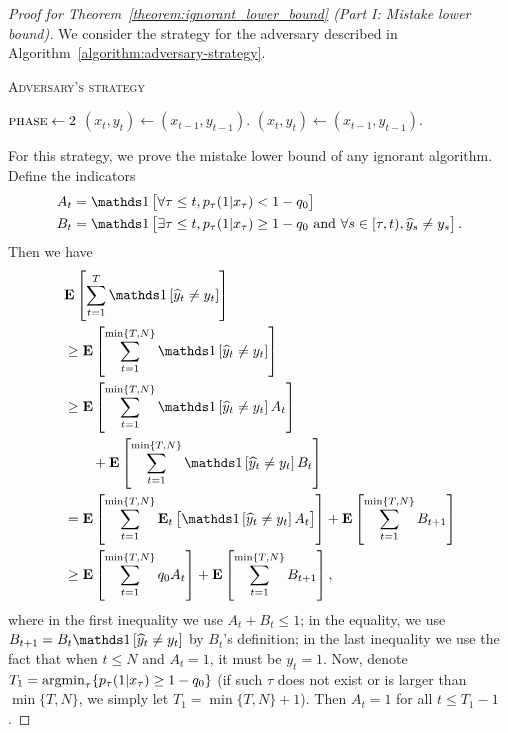 \begin{proof}[Proof for Theorem~\ref{theorem:ignorant_lower_bound} (Part I: Mistake lower bound)]
We consider the strategy for the adversary described in Algorithm~\ref{algorithm:adversary-strategy}.
\begin{algorithm}[h]
\caption{\textsc{Adversary's strategy}}
\label{algorithm:adversary-strategy}
\begin{algorithmic}[1]
{
       \ELSE
          \STATE $\textsc{phase}\leftarrow 2$
       \ENDIF
       \STATE $(x_t, y_t)\leftarrow (x_{t-1}, y_{t-1})$.
    \ENDIF
\ENDFOR
{}
    \STATE $(x_t, y_t)\leftarrow (x_{t-1}, y_{t-1})$.
\ENDFOR


}
\end{algorithmic}
\end{algorithm}
For this strategy, we prove the mistake lower bound of any ignorant algorithm.
Define the indicators
\begin{align*}
A_t &= \indicator{\forall \tau\le t, p_\tau(1|x_\tau)<1-q_0} \\
B_t &= \indicator{\exists \tau\le t, p_\tau(1|x_\tau)\ge 1-q_0
 \text{\ and\ } \forall s\in[\tau,t), \widehat y_s \neq y_s}.
\end{align*}
Then we have
\begin{align}
& \mathbf{E}\left[\sum_{t=1}^{T} \indicator{\widehat y_t\neq y_t}\right] \nonumber \\
& \ge \mathbf{E}\left[\sum_{t=1}^{\min\{T,N\}} \indicator{\widehat y_t\neq y_t}\right] \nonumber \\
& \ge \mathbf{E}\left[\sum_{t=1}^{\min\{T,N\}} \indicator{\widehat y_t\neq y_t}A_t\right] \nonumber \\
& \qquad + \mathbf{E}\left[\sum_{t=1}^{\min\{T,N\}} \indicator{\widehat y_t\neq y_t}B_t\right] \nonumber \\
& = \mathbf{E}\left[\sum_{t=1}^{\min\{T,N\}} \mathbf{E}_t\left[\indicator{\widehat y_t\neq y_t}A_t\right]\right] + \mathbf{E}\left[\sum_{t=1}^{\min\{T,N\}} B_{t+1}\right] \nonumber \\
& \ge \mathbf{E}\left[\sum_{t=1}^{\min\{T,N\}} q_0 A_t\right] + \mathbf{E}\left[\sum_{t=1}^{\min\{T,N\}} B_{t+1}\right],
\label{equation:mistake_lower_bound_temp}
\end{align}
where in the first inequality we use $A_t+B_t\le 1$; in the equality, we use
$B_{t+1}=B_t\indicator{\widehat y_t\neq y_t}$ by $B_t$'s definition; in the last
inequality we use the fact that when $t\le N$ and $A_t=1$, it must be $y_t=1$.
Now, denote $T_1 = \operatorname*{argmin}_{\tau} \{ p_\tau(1|x_\tau) \ge 1-q_0 \}$ (if such
$\tau$ does not exist or is larger than $\min\{T,N\}$, we simply let
$T_1=\min\{T,N\}+1$). Then $A_t=1$ for all $t\le T_1-1$.


\end{proof}
